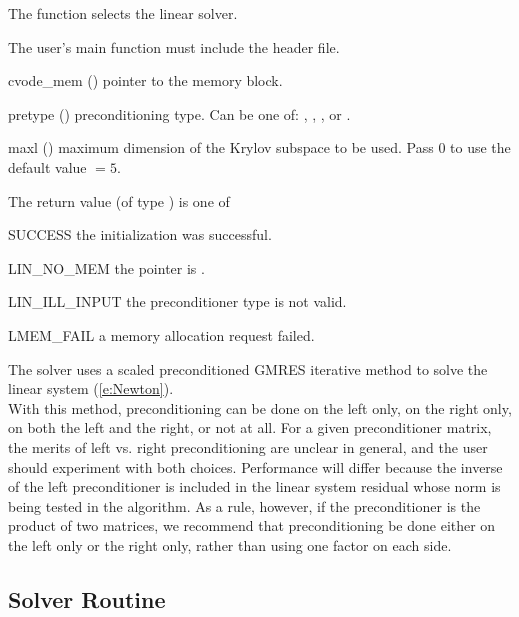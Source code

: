 {
  The function  selects the {\cvspgmr} linear solver. 

  The user's main function must include the  header file.
}
{
  \begin{args}
  \item[cvode\_mem] ()
    pointer to the {\cvodes} memory block.
  \item[pretype] ()
    preconditioning type. Can be one of: , , , or .
  \item[maxl] ()
    maximum dimension of the Krylov subspace to be used. Pass $0$ to use the 
    default value $=5$.
  \end{args}
}
{
  The return value  (of type ) is one of
  \begin{args}
  \item[SUCCESS] 
    the {\cvspgmr} initialization was successful.
  \item[LIN\_NO\_MEM]
    the  pointer is .
  \item[LIN\_ILL\_INPUT]
    the preconditioner type  is not valid.
  \item[LMEM\_FAIL]
    a memory allocation request failed.
  \end{args}
}
{
  The {\cvspgmr} solver uses a scaled preconditioned GMRES
  iterative method to solve the linear system (\ref{e:Newton}).\\
  With this {\spgmr} method, preconditioning 
  can be done on the left only, on the right only, on both the left and the right, 
  or not at all.  For a given preconditioner matrix, the merits of left vs. right
  preconditioning are unclear in general, and the user should experiment
  with both choices.  Performance will differ because the inverse of the
  left preconditioner is included in the linear system residual whose
  norm is being tested in the {\spgmr} algorithm.  As a rule, however, if
  the preconditioner is the product of two matrices, we recommend that
  preconditioning be done either on the left only or the right only,
  rather than using one factor on each side.
}

\subsection{{\cvodes} Solver Routine}\label{sss:cvode}

